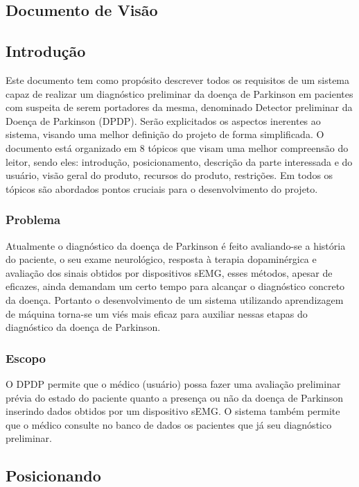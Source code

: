 \begin{anexosenv}
    \chapter[Documento de Visão]{Documento de Visão}
    \label{adocvisao}

    \section{Introdução}

    Este documento tem como propósito descrever todos os requisitos de um sistema capaz de realizar um diagnóstico preliminar da doença de Parkinson em pacientes com suspeita de serem portadores da mesma, denominado Detector preliminar da Doença de Parkinson (DPDP). Serão explicitados os aspectos inerentes ao sistema, visando uma melhor definição do projeto de forma simplificada. O documento está organizado em 8 tópicos que visam uma melhor compreensão do leitor, sendo eles: introdução, posicionamento, descrição da parte interessada e do usuário, visão geral do produto, recursos do produto, restrições. Em todos os tópicos são abordados pontos cruciais para o desenvolvimento do projeto.

    \subsection{Problema}

    Atualmente o diagnóstico da doença de Parkinson é feito avaliando-se a história do paciente, o seu exame neurológico, resposta à terapia dopaminérgica e avaliação dos sinais obtidos por dispositivos sEMG, esses métodos, apesar de eficazes, ainda demandam um certo tempo para alcançar o diagnóstico concreto da doença. Portanto o desenvolvimento de um sistema utilizando aprendizagem de máquina torna-se um viés mais eficaz para auxiliar nessas etapas do diagnóstico da doença de Parkinson.

    \subsection{Escopo}

    O DPDP permite que o médico (usuário) possa fazer uma avaliação preliminar prévia do estado do paciente quanto a presença ou não da doença de Parkinson inserindo dados obtidos por um dispositivo sEMG. O sistema também permite que o médico consulte no banco de dados os pacientes que já seu diagnóstico preliminar.

    \section{Posicionando}


\end{anexosenv}

